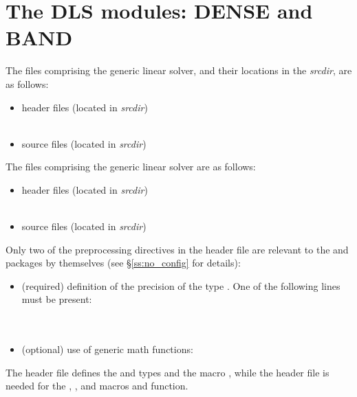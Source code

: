 \section{The DLS modules: DENSE and BAND}\label{s:dls}

The files comprising the {\dense} generic linear solver, and their locations
in the {\sundials} {\em srcdir}, are as follows:
\begin{itemize}
\item header files (located in {\em srcdir})\\
    \\
     
\item source files (located in {\em srcdir})\\
    
\end{itemize}
The files comprising the {\band} generic linear solver are as follows:
\begin{itemize}
\item header files (located in {\em srcdir})\\
    \\
     
\item source files (located in {\em srcdir})\\
    
\end{itemize}
Only two of the preprocessing directives in the header file  
are relevant to the {\dense} and {\band} packages by themselves (see
\S\ref{ss:no_config} for details):
\begin{itemize}
\item (required) definition of the precision of the {\sundials} type . 
  One of the following lines must be present:\\
  \\
  \\
\item (optional) use of generic math functions:
\end{itemize}
The  header file defines the {\sundials}
 and  types and the macro , while the 
 header file is needed for the , , and 
 macros and  function.

